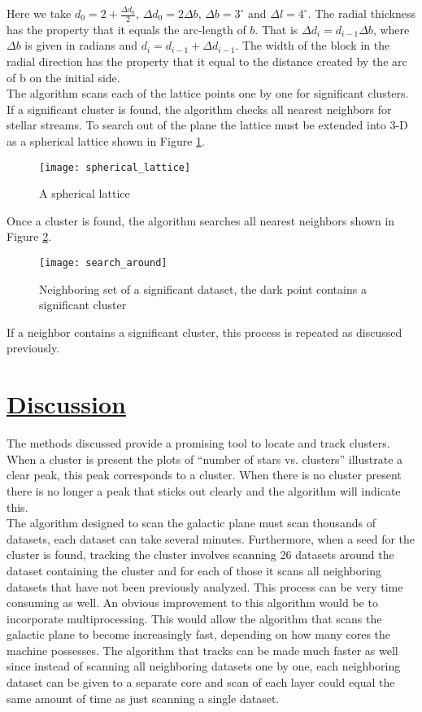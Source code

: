 \documentclass[notitlepage,nofootinbib,preprintnumbers,aps,prd]{revtex4-1}
\begin{document}
\indent Here we take $d_0=2 + \frac{\Delta d_0}{2}$, $\Delta d_0=2 \Delta b$, $\Delta b = 3^{\circ}$ and $\Delta l = 4^{\circ}$. The radial thickness has the property that it equals the arc-length of $b$. That is $\Delta d_i = d_{i-1} \Delta b$, where $\Delta b$ is given in radians and $d_i=d_{i-1} + \Delta d_{i-1}$. The width of the block in the radial direction has the property that it equal to the distance created by the arc of b on the initial side.\\
The algorithm scans each of the lattice points one by one for significant clusters. If a significant cluster is found, the algorithm checks all nearest neighbors for stellar streams. To search out of the plane the lattice must be extended into 3-D as a spherical lattice shown in Figure \ref{fig:sphlat}.\\
\FloatBarrier
\begin{figure}[h]
\centering
\texttt{[image: spherical\_lattice]}
\caption{A spherical lattice}
\label{fig:sphlat}
\end{figure}

Once a cluster is found, the algorithm searches all nearest neighbors shown in Figure \ref{fig:neigh}.
\FloatBarrier
\begin{figure}[h]
\centering
\texttt{[image: search\_around]}
\caption{Neighboring set of a significant dataset, the dark point contains a significant cluster}
\label{fig:neigh}
\end{figure}

If a neighbor contains a significant cluster, this process is repeated as discussed previously.


\section{\underline{Discussion}}
\indent The methods discussed provide a promising tool to locate and track clusters. When a cluster is present the plots of “number of stars vs. clusters” illustrate a clear peak, this peak corresponds to a cluster. When there is no cluster present there is no longer a peak that sticks out clearly and the algorithm will indicate this. \\

\indent The algorithm designed to scan the galactic plane must scan thousands of datasets, each dataset can take several minutes. Furthermore, when a seed for the cluster is found, tracking the cluster involves scanning 26 datasets around the dataset containing the cluster and for each of those it scans all neighboring datasets that have not been previously analyzed. This process can be very time consuming as well. An obvious improvement to this algorithm would be to incorporate multiprocessing. This would allow the algorithm that scans the galactic plane to become increasingly fast, depending on how many cores the machine possesses. The algorithm that tracks can be made much faster as well  since instead of scanning all neighboring datasets one by one, each neighboring dataset can be given to a separate core and scan of each layer could equal the same amount of time as just scanning a single dataset.\\
\end{document}
